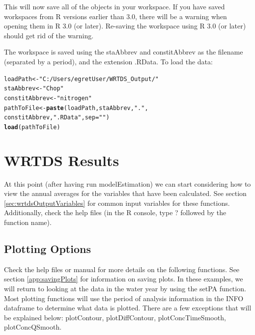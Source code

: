 \documentclass[a4paper,11pt]{article}\usepackage[]{graphicx}\usepackage[]{color}
\makeatletter
\newcommand{\hlstr}[1]{\textcolor[rgb]{0.192,0.494,0.8}{#1}}%
\newcommand{\hlstd}[1]{\textcolor[rgb]{0.345,0.345,0.345}{#1}}%
\newcommand{\hlkwb}[1]{\textcolor[rgb]{0.69,0.353,0.396}{#1}}%
\newcommand{\hlkwc}[1]{\textcolor[rgb]{0.333,0.667,0.333}{#1}}%
\newcommand{\hlkwd}[1]{\textcolor[rgb]{0.737,0.353,0.396}{\textbf{#1}}}%
\newenvironment{kframe}{%
 \def\at@end@of@kframe{}%
 \ifinner\ifhmode%
  \def\at@end@of@kframe{\end{minipage}}%
  \begin{minipage}{\columnwidth}%
 \fi\fi%
 \def\FrameCommand##1{\hskip\@totalleftmargin \hskip-\fboxsep
 \colorbox{shadecolor}{##1}\hskip-\fboxsep
     \hskip-\linewidth \hskip-\@totalleftmargin \hskip\columnwidth}%
 \MakeFramed {\advance\hsize-\width
   \@totalleftmargin\z@ \linewidth\hsize
   \@setminipage}}%
 {\par\unskip\endMakeFramed%
 \at@end@of@kframe}
\newenvironment{knitrout}{}{} %
\makeatother
\begin{document}
This will now save all of the objects in your workspace. If you have saved workspaces from R versions earlier than 3.0, there will be a warning when opening them in R 3.0 (or later). Re-saving the workspace using R 3.0 (or later) should get rid of the warning.

The workspace is saved using the staAbbrev and constitAbbrev as the filename (separated by a period), and the extension .RData. To load the data:

\begin{knitrout}
\color{fgcolor}\begin{kframe}
\begin{alltt}
\hlstd{loadPath} \hlkwb{<-} \hlstr{"C:/Users/egretUser/WRTDS_Output/"}
\hlstd{staAbbrev} \hlkwb{<-} \hlstr{"Chop"}
\hlstd{constitAbbrev} \hlkwb{<-} \hlstr{"nitrogen"}
\hlstd{pathToFile} \hlkwb{<-} \hlkwd{paste}\hlstd{(loadPath,staAbbrev,}\hlstr{"."}\hlstd{,}
                    \hlstd{constitAbbrev,}\hlstr{".RData"}\hlstd{,}\hlkwc{sep}\hlstd{=}\hlstr{""}\hlstd{)}
\hlkwd{load}\hlstd{(pathToFile)}
\end{alltt}
\end{kframe}
\end{knitrout}




\FloatBarrier

\section{WRTDS Results}
\label{sec:wrtdsResults}
At this point (after having run modelEstimation) we can start considering how to view the annual averages for the variables that have been calculated.  See section \ref{sec:wrtdsOutputVariables} for common input variables for these functions. Additionally, check the help files (in the R console, type ? followed by the function name). 

\subsection{Plotting Options}
\label{sec:wrtdsPlotting}

\FloatBarrier

Check the help files or manual for more details on the following functions.  See section \ref{app:savingPlots} for information on saving plots. In these examples, we will return to looking at the data in the water year by using the setPA function. Most plotting functions will use the period of analysis information in the INFO dataframe to determine what data is plotted. There are a few exceptions that will be explained below: plotContour, plotDiffContour, plotConcTimeSmooth, plotConcQSmooth.
\end{document}
